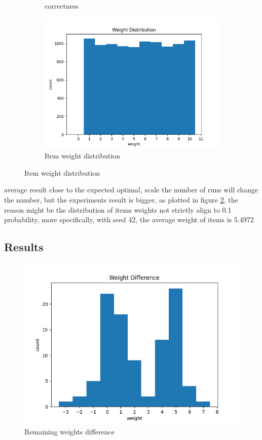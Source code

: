 \begin{figure}[htbp]
\begin{subfigure}[htbp]{0.33\textwidth}
        \caption{correctness}
        \label{fig:fig_2}
    \end{subfigure}
    \hfill
    \begin{subfigure}[htbp]{0.33\textwidth}
        \centering
        \includegraphics[width=\textwidth]{fig/asg1_weight_dist.png}
        \caption{Item weight distribution}
        \label{fig:weightdist}
    \end{subfigure}
    \label{fig:gain}
\end{figure}

average result close to the expected optimal, scale the number of runs will change the number, but the experiments result is bigger, as plotted in figure \ref{fig:weightdist}, the reason might be the distribution of items weights not strictly align to 0.1 probability, more specifically, with seed 42, the average weight of items is 5.4972 
\subsection{Results}
\begin{figure}[htbp]
    \centering
    \includegraphics[width=0.8\linewidth]{fig/asg1_weight_diff.png}
    \caption {Remaining weights difference}
    \label{fig:gain}
\end{figure}




